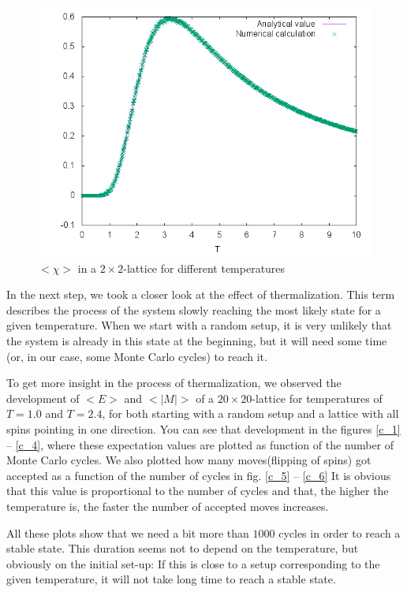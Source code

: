 \documentclass[10pt,a4paper]{article}
\begin{document}
\begin{figure}[h]
	\includegraphics[width=\textwidth]{Susceptibility.png}
	\caption{$<\chi>$ in a $2\times 2$-lattice for different temperatures\label{b_chi}}
\end{figure}
In the next step, we took a closer look at the effect of thermalization. This term describes the process of the system slowly reaching the most likely state for a given temperature. When we start with a random setup, it is very unlikely that the system is already in this state at the beginning, but it will need some time (or, in our case, some Monte Carlo cycles) to reach it.

To get more insight in the process of thermalization, we observed the development of $<E>$ and $<|M|>$ of a $20\times20$-lattice for temperatures of $T=1.0$ and $T=2.4$, for both starting with a random setup and a lattice with all spins pointing in one direction. You can see that development in the figures \ref{c_1} -- \ref{c_4}, where these expectation values are plotted as function of the number of Monte Carlo cycles. We also plotted how many \glq moves\grq (flipping of spins) got accepted as a function of the number of cycles in fig. \ref{c_5} -- \ref{c_6} It is obvious that this value is proportional to the number of cycles and that, the higher the temperature is, the faster the number of accepted moves increases.

All these plots show that we need a bit more than $1000$ cycles in order to reach a stable state. This duration seems not to depend on the temperature, but obviously on the initial set-up: If this is close to a setup corresponding to the given temperature, it will not take long time to reach a stable state.
\end{document}
